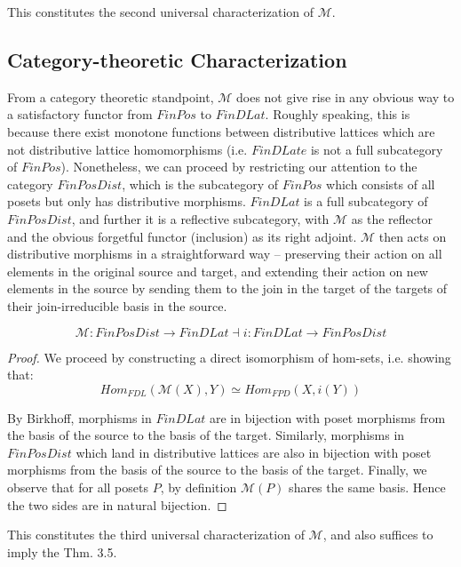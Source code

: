 \documentclass[hoptionsi,review,format=sigplan]{acmart}
\theoremstyle{definition}
\newcommand{\Mcc}{\mathcal{M}}
\begin{document}
This constitutes the second universal characterization of \(\Mcc\).

\subsection{Category-theoretic Characterization}

From a category theoretic standpoint, \(\Mcc\) does not give rise in any obvious way to a satisfactory functor from \(FinPos\) to \(FinDLat\). Roughly speaking, this is because there exist monotone functions between distributive lattices which are not distributive lattice homomorphisms (i.e. \(FinDLate\) is not a full subcategory of \(FinPos\)). Nonetheless, we can proceed by restricting our attention to the category \(FinPosDist\), which is the subcategory of \(FinPos\) which consists of all posets but only has distributive morphisms. \(FinDLat\) is a full subcategory of \(FinPosDist\), and further it is a reflective subcategory, with \(\Mcc\) as the reflector and the obvious forgetful functor (inclusion) as its right adjoint. \(\Mcc\) then acts on distributive morphisms in a straightforward way -- preserving their action on all elements in the original source and target, and extending their action on new elements in the source by sending them to the join in the target of the targets of their join-irreducible basis in the source.

\begin{theorem}
\begin{equation*}
\Mcc : FinPosDist \rightarrow FinDLat \allowbreak  \dashv \allowbreak i : FinDLat \rightarrow FinPosDist
\end{equation*}
\end{theorem}

\begin{proof}
We proceed by constructing a direct isomorphism of hom-sets, i.e. showing that:
\begin{equation*}
Hom_{FDL}(\Mcc(X),Y) \allowbreak \simeq \allowbreak Hom_{FPD}(X,i(Y))
\end{equation*}

By Birkhoff, morphisms in \(FinDLat\) are in bijection with poset morphisms from the basis of the source to the basis of the target. Similarly, morphisms in \(FinPosDist\) which land in distributive lattices are also in bijection with poset morphisms from the basis of the source to the basis of the target. Finally, we observe that for all posets \(P\), by definition \(\Mcc(P)\) shares the same basis. Hence the two sides are in natural bijection.
\end{proof}
This constitutes the third universal characterization of \(\Mcc\), and also suffices to imply the Thm. 3.5.
\end{document}
